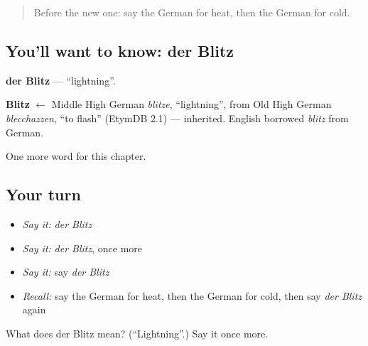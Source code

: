 \begin{quote}
Before the new one: say the German for heat, then the German for cold.
\end{quote}

\subsection*{You'll want to know: der Blitz}
\textbf{der Blitz} — \textquotedblleft{}lightning\textquotedblright{}.

\begin{cousinweb}
\textbf{Blitz} $\leftarrow$ Middle High German \emph{blitze}, \textquotedblleft{}lightning\textquotedblright{}, from Old High German \emph{blecchazzen}, \textquotedblleft{}to flash\textquotedblright{} (EtymDB 2.1) — inherited. English borrowed \emph{blitz} from German.
\end{cousinweb}

\begin{grammarlens}[title={What you've built}]
One more word for this chapter.
\end{grammarlens}

\subsection*{Your turn}
\begin{itemize}
\raggedright
  \item \emph{Say it:} \emph{der Blitz}
  \item \emph{Say it:} \emph{der Blitz}, once more
  \item \emph{Say it:} say \emph{der Blitz}
  \item \emph{Recall:} say the German for heat, then the German for cold, then say \emph{der Blitz} again
\end{itemize}

\begin{tcolorbox}[breakable,colback=teal!4,colframe=teal!35!black,title={Before you move on}]
What does der Blitz mean? (\textquotedblleft{}Lightning\textquotedblright{}.) Say it once more.
\end{tcolorbox}
